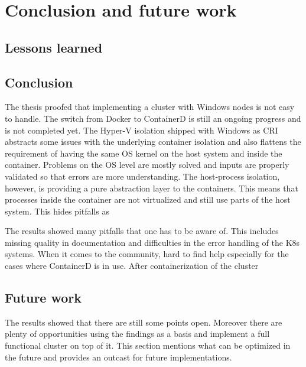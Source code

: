 \chapter{Conclusion and future work} %

\label{chap:conclusion} %



\section{Lessons learned}

\section{Conclusion}
The thesis proofed that implementing a cluster with \ac{Windows} nodes is not easy to handle. The switch from Docker to ContainerD is still an ongoing progress and is not completed yet.
The Hyper-V isolation shipped with \ac{Windows} as \ac{CRI} abstracts some issues with the underlying container isolation and also flattens the requirement of having the same \ac{OS} kernel on the host system and inside the container. Problems on the \ac{OS} level are mostly solved and inputs are properly validated so that errors are more understanding.
The host-process isolation, however, is providing a pure abstraction layer to the containers. This means that processes inside the container are not virtualized and still use parts of the host system.
This hides pitfalls as %

The results showed many pitfalls that one has to be aware of. This includes missing quality in documentation and difficulties in the error handling of the \ac{K8s} systems. When it comes to the community, hard to find help especially for the cases where ContainerD is in use.
After containerization of the cluster


\section{Future work}
The results showed that there are still some points open. Moreover there are plenty of opportunities using the findings as a basis and implement a full functional cluster on top of it. This section mentions what can be optimized in the future and provides an outcast for future implementations.


